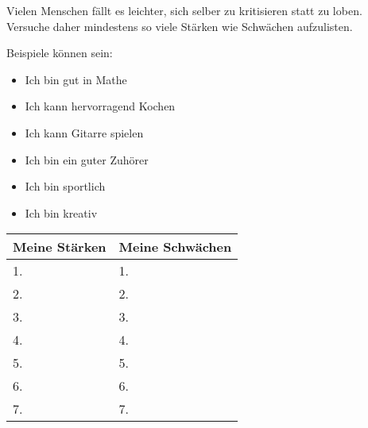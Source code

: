 \documentclass[../Lebensziel.tex]{subfiles}
\begin{document}
Vielen Menschen fällt es leichter, sich selber zu kritisieren statt zu loben. Versuche daher mindestens so viele Stärken wie Schwächen aufzulisten.

Beispiele können sein:
\begin{multicols}{2}
    \begin{itemize}
        \item Ich bin gut in Mathe
        \item Ich kann hervorragend Kochen
        \item Ich kann Gitarre spielen
        \item Ich bin ein guter Zuhörer
        \item Ich bin sportlich
        \item Ich bin kreativ
    \end{itemize}
\end{multicols}

\begin{table}[h!]
    \centering
    \setlength{\tabcolsep}{18pt}
    \renewcommand{\arraystretch}{1.5}
    \begin{tabular}{p{5.5cm}|p{5.5cm}}
        \textbf{Meine Stärken} & \textbf{Meine Schwächen} \\\hline
        1.                     & 1.                       \\\hline
        2.                     & 2.                       \\\hline
        3.                     & 3.                       \\\hline
        4.                     & 4.                       \\\hline
        5.                     & 5.                       \\\hline
        6.                     & 6.                       \\\hline
        7.                     & 7.
    \end{tabular}
    \label{stärken+schwächen}
\end{table}
\end{document}
